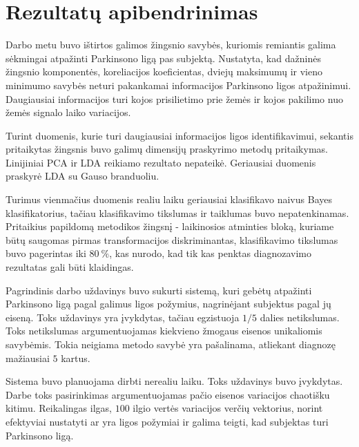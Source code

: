 \documentclass[]{vgtuef}
\begin{document}
\section{Rezultatų apibendrinimas}


Darbo metu buvo ištirtos galimos žingsnio savybės, kuriomis remiantis galima sėkmingai atpažinti Parkinsono ligą pas subjektą. Nustatyta, kad dažninės žingsnio komponentės, koreliacijos koeficientas, dviejų maksimumų ir vieno minimumo savybės neturi pakankamai informacijos Parkinsono ligos atpažinimui. Daugiausiai informacijos turi kojos prisilietimo prie žemės ir kojos pakilimo nuo žemės signalo laiko variacijos.

Turint duomenis, kurie turi daugiausiai informacijos ligos identifikavimui, sekantis pritaikytas žingsnis buvo galimų dimensijų praskyrimo metodų pritaikymas. Linijiniai PCA ir LDA reikiamo rezultato nepateikė. Geriausiai duomenis praskyrė LDA su Gauso branduoliu. 

Turimus vienmačius duomenis realiu laiku geriausiai klasifikavo naivus Bayes klasifikatorius, tačiau klasifikavimo tikslumas ir taiklumas buvo nepatenkinamas. Pritaikius papildomą metodikos žingsnį - laikinosios atminties bloką, kuriame būtų saugomas pirmas transformacijos diskriminantas, klasifikavimo tikslumas buvo pagerintas iki $80~\%$, kas nurodo, kad tik kas penktas diagnozavimo rezultatas gali būti klaidingas.


Pagrindinis darbo uždavinys buvo sukurti sistemą, kuri gebėtų atpažinti Parkinsono ligą pagal galimus ligos požymius, nagrinėjant subjektus pagal jų eiseną. Toks uždavinys yra įvykdytas, tačiau egzistuoja $1/5$ dalies netikslumas. Toks netikslumas argumentuojamas kiekvieno žmogaus eisenos unikaliomis savybėmis. Tokia neigiama metodo savybė yra pašalinama, atliekant diagnozę mažiausiai $5$ kartus.

Sistema buvo planuojama dirbti nerealiu laiku. Toks uždavinys buvo įvykdytas. Darbe toks pasirinkimas argumentuojamas pačio eisenos variacijos chaotišku kitimu. Reikalingas ilgas, $100$ ilgio vertės variacijos verčių vektorius, norint efektyviai nustatyti ar yra ligos požymiai ir galima teigti, kad subjektas turi Parkinsono ligą.

\end{document}
